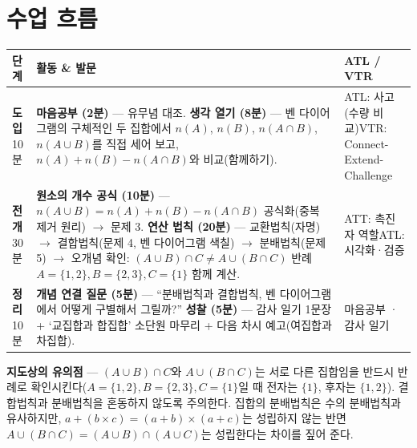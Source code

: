 \documentclass[11pt,a4paper]{article}
\begin{document}
\section{수업 흐름}
\begin{tabularx}{\linewidth}{@{}>{\centering\arraybackslash}p{1.6cm}X>{\raggedright\arraybackslash\small}p{3.1cm}@{}}
\toprule
\textbf{단계} & \textbf{활동 \& 발문} & \textbf{ATL / VTR} \\
\midrule
\textcolor{goldstrong}{\textbf{도입}}\newline\footnotesize 10분 &
\textbf{마음공부 (2분)} --- 유무념 대조.\newline
\textbf{생각 열기 (8분)} --- 벤 다이어그램의 구체적인 두 집합에서 $n(A)$, $n(B)$, $n(A\cap B)$, $n(A\cup B)$를 직접 세어 보고, $n(A)+n(B)-n(A\cap B)$와 비교(함께하기). &
ATL: 사고(수량 비교)\newline VTR: Connect-Extend-Challenge \\
\addlinespace
\textcolor{goldstrong}{\textbf{전개}}\newline\footnotesize 30분 &
\textbf{원소의 개수 공식 (10분)} --- $n(A\cup B)=n(A)+n(B)-n(A\cap B)$ 공식화(중복 제거 원리) $\to$ 문제 3.\newline
\textbf{연산 법칙 (20분)} --- 교환법칙(자명) $\to$ 결합법칙(문제 4, 벤 다이어그램 색칠) $\to$ 분배법칙(문제 5) $\to$ 오개념 확인: $(A\cup B)\cap C \ne A\cup(B\cap C)$ 반례 $A=\{1,2\},B=\{2,3\},C=\{1\}$ 함께 계산. &
ATT: 촉진자 역할\newline ATL: 시각화·검증 \\
\addlinespace
\textcolor{goldstrong}{\textbf{정리}}\newline\footnotesize 10분 &
\textbf{개념 연결 질문 (5분)} --- ``분배법칙과 결합법칙, 벤 다이어그램에서 어떻게 구별해서 그릴까?''\newline
\textbf{성찰 (5분)} --- 감사 일기 1문장 + `교집합과 합집합' 소단원 마무리 + 다음 차시 예고(여집합과 차집합). &
마음공부 · 감사 일기 \\
\bottomrule
\end{tabularx}

\begin{calloutbox}
\textbf{지도상의 유의점} --- $(A\cup B)\cap C$와 $A\cup(B\cap C)$는 서로 다른 집합임을 반드시 반례로 확인시킨다($A=\{1,2\}, B=\{2,3\}, C=\{1\}$일 때 전자는 $\{1\}$, 후자는 $\{1,2\}$). 결합법칙과 분배법칙을 혼동하지 않도록 주의한다. 집합의 분배법칙은 수의 분배법칙과 유사하지만, $a+(b\times c)=(a+b)\times(a+c)$는 성립하지 않는 반면 $A\cup(B\cap C)=(A\cup B)\cap(A\cup C)$는 성립한다는 차이를 짚어 준다.
\end{calloutbox}
\end{document}
